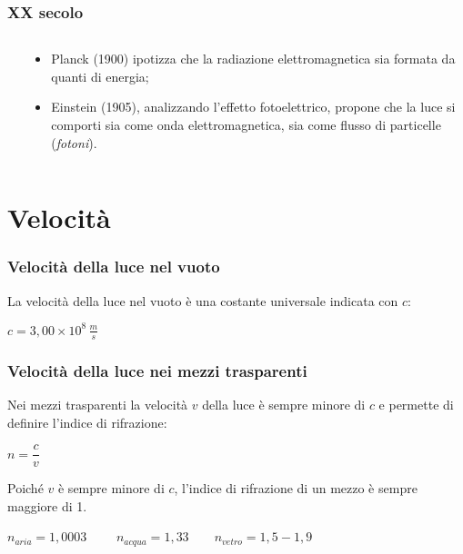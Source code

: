 \documentclass[]{beamer}
\theoremstyle{plain}
\begin{document}
\begin{frame}
\frametitle{XX secolo}
\begin{columns}
\begin{column}{0.2\textwidth}
~
\end{column}
\begin{column}{0.7\textwidth}
\begin{itemize}
  \item<1-> Planck (1900) ipotizza che la radiazione elettromagnetica sia formata da quanti di energia;
  \item<2-> Einstein (1905), analizzando l'effetto fotoelettrico, propone che la luce si comporti sia come onda elettromagnetica, sia come flusso di particelle (\emph{fotoni}).
\end{itemize}
\end{column}
\end{columns}
\end{frame}


\section{Velocità}

\begin{frame}
\frametitle{Velocità della luce nel vuoto}
La velocità della luce nel vuoto è una costante universale indicata con $ c $:

\begin{center}
\colorbox{blue!30}{$ c = 3,00 \times 10^8 \, \frac{m}{s} $} 
\end{center}
\end{frame}

\begin{frame}
\frametitle{Velocità della luce nei mezzi trasparenti}
Nei mezzi trasparenti la velocità $ v $ della luce è sempre minore di $ c $ e permette di definire l'\alert{indice di rifrazione}:
\begin{center}
\colorbox{blue!30}{$ n = \dfrac{c}{v} $} 
\end{center}\pause
Poiché $ v $ è sempre minore di $ c $, l'indice di rifrazione di un mezzo è sempre maggiore di 1.
\begin{center}
$ n_{aria} = 1,0003$~~~~ $ n_{acqua} = 1,33$~~~~$ n_{vetro} = 1,5-1,9$
\end{center}
\end{frame}
\end{document}
